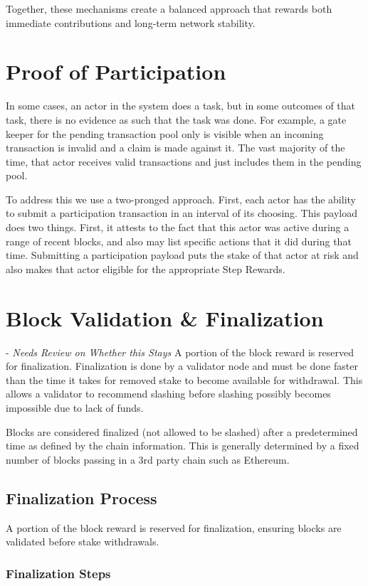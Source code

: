 \documentclass{article}
\begin{document}
Together, these mechanisms create a balanced approach that rewards both
immediate contributions and long-term network stability.

\section{Proof of Participation}
In some cases, an actor in the system does a task, but in some outcomes of that
task, there is no evidence as such that the task was done. For example, a gate
keeper for the pending transaction pool only is visible when an incoming
transaction is invalid and a claim is made against it. The vast majority of the
time, that actor receives valid transactions and just includes them in the
pending pool.

To address this we use a two-pronged approach. First, each actor has the
ability to submit a participation transaction in an interval of its choosing.
This payload does two things. First, it attests to the fact that this actor was
active during a range of recent blocks, and also may list specific actions that
it did during that time. Submitting a participation payload puts the stake of
that actor at risk and also makes that actor eligible for the appropriate Step
Rewards.

\section{Block Validation \& Finalization} - \textit{Needs Review on Whether this Stays}
A portion of the block reward is reserved for finalization. Finalization is done by a validator node and must be done faster than the time it takes for removed stake to become available for withdrawal. This allows a validator to recommend slashing before slashing possibly becomes impossible due to lack of funds.

Blocks are considered finalized (not allowed to be slashed) after a
predetermined time as defined by the chain information. This is generally
determined by a fixed number of blocks passing in a 3rd party chain such as
Ethereum.

\subsection{Finalization Process}

A portion of the block reward is reserved for finalization, ensuring blocks are
validated before stake withdrawals.

\subsubsection{Finalization Steps}
\end{document}
